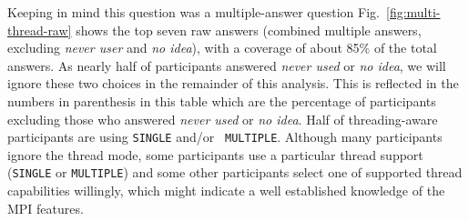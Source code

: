 \documentclass[preprint,5p,times]{elsarticle}
\def\myquote#1{{\it #1}}
\newcommand{\revision}[2]{{\color{blue}#2}}
\begin{document}
Keeping in mind this question was a
\revision{multiple-choice}{multiple-answer} question
\revision{Table~\ref{tab:multi-thread-raw}}{Fig.~\ref{fig:multi-thread-raw}}
shows the top \revision{7}{seven} raw answers
(combined multiple answers\revision{}{, excluding \myquote{never user} and
  \myquote{no idea}}),
with a coverage of about 85\% of the total answers.
As nearly half of participants answered \myquote{never used} or \myquote{no idea},
we will ignore these two choices in the remainder of this analysis. This is
reflected in the numbers in parenthesis in this table which are the percentage
of participants excluding those who answered \myquote{never used} or \myquote{no
idea}. Half of threading-aware participants are using {\tt SINGLE} and/or {\tt
MULTIPLE}. Although many participants ignore the thread mode, some participants
use a particular thread support ({\tt SINGLE} or {\tt MULTIPLE}) and some other
participants select one of supported thread capabilities willingly, which might
indicate a well established knowledge of the MPI features.
\end{document}
